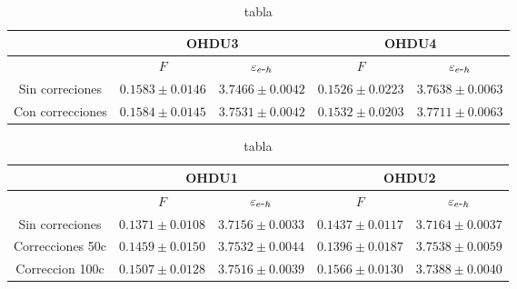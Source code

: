 \begin{table}[]
\begin{tabular}{@{}ccccc@{}}
\toprule
                      & \multicolumn{2}{c}{OHDU3}                                           & \multicolumn{2}{c}{OHDU4}                      \\ \hline \hline
\multicolumn{1}{c}{} & \multicolumn{1}{c}{$F$} & \multicolumn{1}{c}{$\varepsilon_{e\mbox{-}h}$} & \multicolumn{1}{c}{$F$} & $\varepsilon_{e\mbox{-}h}$ \\ \hline
\multicolumn{1}{c}{Sin correciones} &
  \multicolumn{1}{c}{$0.1583 \pm 0.0146$} &
  \multicolumn{1}{c}{$3.7466 \pm 0.0042$} &
  \multicolumn{1}{c}{$0.1526 \pm 0.0223$} &
  $3.7638 \pm 0.0063$ \\
\multicolumn{1}{c}{Con correcciones} &
  \multicolumn{1}{c}{$0.1584 \pm 0.0145$} &
  \multicolumn{1}{c}{$3.7531 \pm 0.0042$} &
  \multicolumn{1}{c}{$0.1532 \pm 0.0203$} &
  \multicolumn{1}{c}{$3.7711 \pm 0.0063$} \\ \hline
\end{tabular}
\caption{tabla}
\label{tab:Correcciones2}
\end{table}


\begin{table}[]
\begin{tabular}{@{}ccccc@{}}
\toprule
 &
  \multicolumn{2}{c}{OHDU1} &
  \multicolumn{2}{c}{OHDU2} \\ \midrule
 &
  $F$ &
  \multicolumn{1}{c}{$\varepsilon_{e\mbox{-}h}$} &
  $F$ &
  \multicolumn{1}{c}{$\varepsilon_{e\mbox{-}h}$} \\
Sin correciones &
  $0.1371 \pm 0.0108$ &
  \multicolumn{1}{c}{$3.7156 \pm 0.0033$} &
  $0.1437 \pm 0.0117$ &
  \multicolumn{1}{c}{$3.7164 \pm 0.0037$} \\
Correcciones 50c &
  \multicolumn{1}{c}{$0.1459 \pm 0.0150$} &
  $3.7532 \pm 0.0044$ &
  \multicolumn{1}{c}{$0.1396 \pm 0.0187$} &
  $3.7538 \pm 0.0059$ \\
\multicolumn{1}{c}{Correccion 100c} & \multicolumn{1}{c}{$0.1507 \pm 0.0128$} & $3.7516 \pm 0.0039$ & \multicolumn{1}{c}{$0.1566 \pm 0.0130$} & $3.7388 \pm 0.0040$ \\ \bottomrule
\end{tabular}
\caption{tabla}
\label{tab:Correcciones3}
\end{table}


